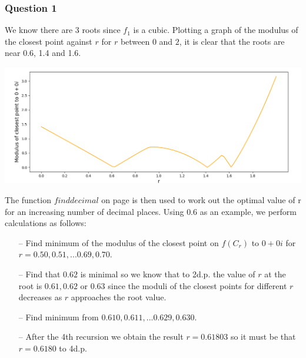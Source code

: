 \documentclass[12pt, a4paper]{article}
\begin{document}
	

\subsubsection*{Question 1}

We know there are 3 roots since $f_{1}$ is a cubic. Plotting a graph of the modulus of the closest point against $r$ for $r$ between $0$ and $2$, it is clear that the roots are near 0.6, 1.4 and 1.6. 
\vspace{0.2cm}\\
\begin{minipage}{\textwidth}
	\includegraphics[width=\linewidth]{q1_fig1}
\end{minipage}
\vspace{0.4cm}

The function $find$\textunderscore$decimal$ on page \pageref{finddec} is then used to work out the optimal value of r for an increasing number of decimal places. Using $0.6$ as an example, we perform calculations as follows:
\begin{itemize}
	\item[--] Find minimum of the modulus of the closest point on $f(C_{r})$ to $0+0i$ for \\ $ r= 0.50, 0.51, ... 0.69, 0.70$.
	\item[--] Find that $0.62$ is minimal so we know that to 2d.p. the value of $r$ at the root is $0.61, 0.62$ or $0.63$ since the moduli of the closest points for different $r$ decreases as $r$ approaches the root value.
	\item[--] Find minimum from $0.610, 0.611, ... 0.629, 0.630$.
	\item[--] After the 4th recursion we obtain the result $r = 0.61803$ so it must be that $r = 0.6180$ to 4d.p.
\end{itemize}
\end{document}
